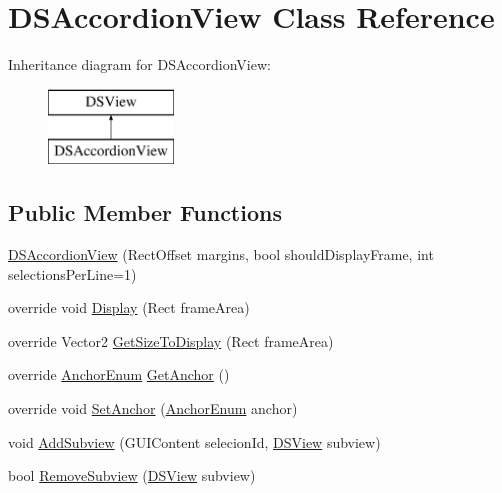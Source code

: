 \hypertarget{class_d_s_accordion_view}{\section{D\+S\+Accordion\+View Class Reference}
\label{class_d_s_accordion_view}
}
Inheritance diagram for D\+S\+Accordion\+View\+:\begin{figure}[H]
\begin{center}
\leavevmode
\includegraphics[height=2.000000cm]{class_d_s_accordion_view}
\end{center}
\end{figure}
\subsection*{Public Member Functions}
\begin{DoxyCompactItemize}
\item 
\hyperlink{class_d_s_accordion_view_abec65f83d4d240cd688a0d03efe2827f}{D\+S\+Accordion\+View} (Rect\+Offset margins, bool should\+Display\+Frame, int selections\+Per\+Line=1)
\item 
override void \hyperlink{class_d_s_accordion_view_abcf11589f0cb315e51d2fea702285e36}{Display} (Rect frame\+Area)
\item 
override Vector2 \hyperlink{class_d_s_accordion_view_a0b12b70416b43fcd2a5a14b939a83dee}{Get\+Size\+To\+Display} (Rect frame\+Area)
\item 
override \hyperlink{class_d_s_view_a8b41b9ec1b18bd33872a37cbd3a2dbe1}{Anchor\+Enum} \hyperlink{class_d_s_accordion_view_a864f8ed6db34fd5b7fde680c9a23145a}{Get\+Anchor} ()
\item 
override void \hyperlink{class_d_s_accordion_view_ae35a4982fb83a0fcadb1264d6f328ee4}{Set\+Anchor} (\hyperlink{class_d_s_view_a8b41b9ec1b18bd33872a37cbd3a2dbe1}{Anchor\+Enum} anchor)
\item 
void \hyperlink{class_d_s_accordion_view_acf3a8f1d1663251f1497081d69fb6eae}{Add\+Subview} (G\+U\+I\+Content selecion\+Id, \hyperlink{class_d_s_view}{D\+S\+View} subview)
\item 
bool \hyperlink{class_d_s_accordion_view_ac6544fd3f2e8257f79f953732965bdbd}{Remove\+Subview} (\hyperlink{class_d_s_view}{D\+S\+View} subview)
\end{DoxyCompactItemize}
